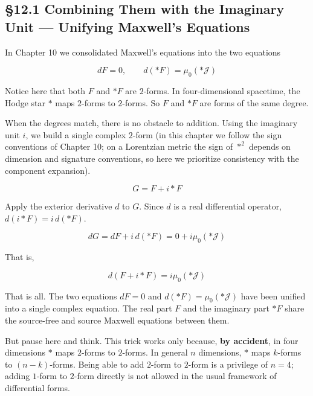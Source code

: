 \documentclass[a4paper,12pt,openany]{book}
\begin{document}
\par\vspace{0.35em}\par

\hypertarget{combining-them-with-the-imaginary-unit-unifying-maxwells-equations}{%
\subsection{§12.1 Combining Them with the Imaginary Unit — Unifying
Maxwell's
Equations}\label{combining-them-with-the-imaginary-unit-unifying-maxwells-equations}}

In Chapter 10 we consolidated Maxwell's equations into the two equations

\[dF = 0, \qquad d(\ast F) = \mu_0(\ast\mathcal{J})\]

Notice here that both \(F\) and \(\ast F\) are \(2\)-forms. In
four-dimensional spacetime, the Hodge star \(\ast\) maps \(2\)-forms to
\(2\)-forms. So \(F\) and \(\ast F\) are forms of the same degree.

When the degrees match, there is no obstacle to addition. Using the
imaginary unit \(i\), we build a single complex \(2\)-form (in this
chapter we follow the sign conventions of Chapter 10; on a Lorentzian
metric the sign of \(\ast^2\) depends on dimension and signature
conventions, so here we prioritize consistency with the component
expansion).

\[G = F + i\ast F\]

Apply the exterior derivative \(d\) to \(G\). Since \(d\) is a real
differential operator, \(d(i\ast F) = i\,d(\ast F)\).

\[dG = dF + i\,d(\ast F) = 0 + i\mu_0(\ast\mathcal{J})\]

That is,

\[d(F + i\ast F) = i\mu_0(\ast\mathcal{J})\]

That is all. The two equations \(dF=0\) and
\(d(\ast F)=\mu_0(\ast\mathcal{J})\) have been unified into a single
complex equation. The real part \(F\) and the imaginary part \(\ast F\)
share the source-free and source Maxwell equations between them.

But pause here and think. This trick works only because, \textbf{by
accident}, in four dimensions \(\ast\) maps \(2\)-forms to \(2\)-forms.
In general \(n\) dimensions, \(\ast\) maps \(k\)-forms to
\((n-k)\)-forms. Being able to add \(2\)-form to \(2\)-form is a
privilege of \(n=4\); adding \(1\)-form to \(2\)-form directly is not
allowed in the usual framework of differential forms.
\end{document}
